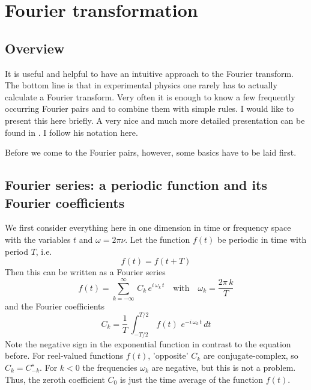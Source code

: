 \renewcommand{\lastmod}{May 20, 2020}
\renewcommand{\chapterauthors}{Markus Lippitz}

\chapter{Fourier transformation}
\label{chap:Appendix_Fourier}

\section{Overview}

It is useful and helpful to have an intuitive approach to the Fourier transform. The bottom line is that in experimental physics one rarely has to actually calculate a Fourier transform. Very often it is enough to know a few frequently occurring Fourier pairs and to combine them with simple rules. I would like to present this here briefly. A very nice and much more detailed presentation can be found in \cite{Butz2015}. I follow his notation here.

Before we come to the Fourier pairs, however, some basics have to be laid first.

\section{Fourier series: a periodic function and its Fourier coefficients}

We first consider everything here in one dimension in time or frequency space with the variables $t$ and $\omega = 2 \pi \nu$. Let the function $f(t)$ be periodic in time with period $T$, i.e. 
\begin{equation}
 f(t) = f (t + T)
\end{equation}
Then this can be written as a Fourier series
\begin{equation}
 f(t) = \sum_{k=-\infty}^{\infty} \, C_k \, e^{i \, \omega_k \, t}
 \quad \text{with} \quad \omega_k = \frac{2 \pi \, k}{T}
\end{equation}
and the Fourier coefficients
\begin{equation}
 C_k = \frac{1}{T} \, \int_{-T/2}^{T/2} \, f(t) \, \, e^{-i \, \omega_k \, t} \, dt
\end{equation}
Note the negative sign in the exponential function in contrast to the equation before. For reel-valued functions $f(t)$, 'opposite' $C_k$ are conjugate-complex, so $C_k = C_{-k}^\star$. For $k<0$ the frequencies $\omega_k$ are negative, but this is not a problem. Thus, the zeroth coefficient $C_0$ is just the time average of the function $f(t)$.



